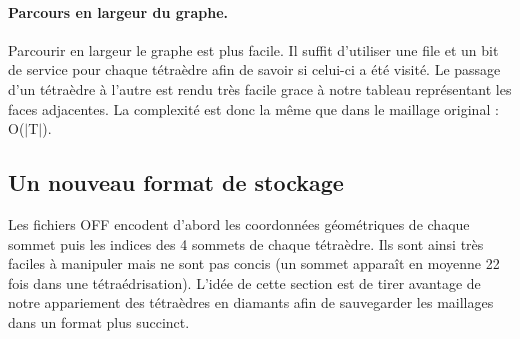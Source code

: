 \paragraph{Parcours en largeur du graphe.}
\noindent
Parcourir en largeur le graphe est plus facile. Il suffit d'utiliser une file et un bit de service pour chaque tétraèdre afin de savoir si celui-ci a été visité. Le passage d'un tétraèdre à l'autre est rendu très facile grace à notre tableau représentant les faces adjacentes. La complexité est donc la même que dans le maillage original : O($|$T$|$).

% 
% 


\subsection{Un nouveau format de stockage}
\noindent
Les fichiers OFF encodent d'abord les coordonnées géométriques de chaque sommet puis les indices des 4 sommets de chaque tétraèdre. Ils sont ainsi très faciles à manipuler mais ne sont pas concis (un sommet apparaît en moyenne 22 fois dans une tétraédrisation). L'idée de cette section est de tirer avantage de notre appariement des tétraèdres en diamants afin de sauvegarder les maillages dans un format plus succinct.
